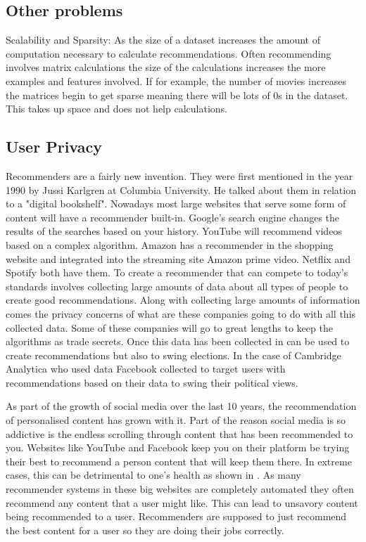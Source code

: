         \subsection{Other problems}
            Scalability and Sparsity:
            As the size of a dataset increases the amount of computation necessary to calculate recommendations. Often recommending involves matrix calculations the size of the calculations increases the more examples and features involved. 
            If for example, the number of movies increases the matrices begin to get sparse meaning there will be lots of 0s in the dataset. This takes up space and does not help calculations. 


        \subsection{User Privacy}
            Recommenders are a fairly new invention. They were first mentioned in the year 1990 by Jussi Karlgren at Columbia University. He talked about them in relation to a "digital bookshelf". Nowadays most large websites that serve some form of content will have a recommender built-in. Google's search engine changes the results of the searches based on your history. YouTube will recommend videos based on a complex algorithm. Amazon has a recommender in the shopping website and integrated  into the streaming site Amazon prime video. Netflix and Spotify both have them. To create a recommender that can compete to today's standards involves collecting large amounts of data about all types of people to create good recommendations. Along with collecting large amounts of information comes the privacy concerns of what are these companies going to do with all this collected data. Some of these companies will go to great lengths to keep the algorithms as trade secrets. Once this data has been collected in can be used to create recommendations but also to swing elections. In the case of Cambridge Analytica who used data Facebook collected to target users with recommendations based on their data to swing their political views.
            
            As part of the growth of social media over the last 10 years, the recommendation of personalised content has grown with it. Part of the reason social media is so addictive is the endless scrolling through content that has been recommended to you. Websites like YouTube and Facebook keep you on their platform be trying their best to recommend a person content that will keep them there. In extreme cases, this can be detrimental to one's health as shown in \cite{SocialMediaAddiction}. As many recommender systems in these big websites are completely automated they often recommend any content that a user might like. This can lead to unsavory content being recommended to a user. Recommenders are supposed to just recommend the best content for a user so they are doing their jobs correctly. 
        
